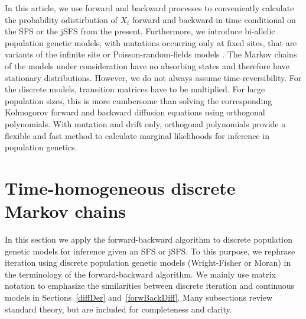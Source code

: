 \documentclass[preprint]{elsarticle}
\begin{document}
In this article, we use forward and backward processes to conveniently calculate the probability odistirbution of $X_t$ forward and backward in time conditional on the SFS or the jSFS from the present. %
Furthermore, we introduce bi-allelic population genetic models, with mutations occurring only at fixed sites, that are variants of the infinite site or Poisson-random-fields models \citep{Kimu69,Sawy92}. The Markov chains of the models under consideration have no absorbing states and therefore have stationary distributions. However, we do not always assume time-reversibility. For the discrete models, transition matrices have to be multiplied. For large population sizes, this is more cumbersome than solving the corresponding Kolmogorov forward and backward diffusion equations using orthogonal polynomials. With mutation and drift only, orthogonal polynomials provide a flexible and fast method to calculate marginal likelihoods for inference in population genetics.

\section{Time-homogeneous discrete Markov chains}

In this section we apply the forward-backward algorithm to discrete population genetic models for inference given an SFS or jSFS. To this purpose, we rephrase iteration using discrete population genetic models (Wright-Fisher or Moran) in the terminology of the forward-backward algorithm. We mainly use matrix notation to emphasize the similarities between discrete iteration and continuous models in Sections~\ref{diffDer} and~\ref{forwBackDiff}. Many subsections review standard theory, but are included for completeness and clarity. 
\end{document}
